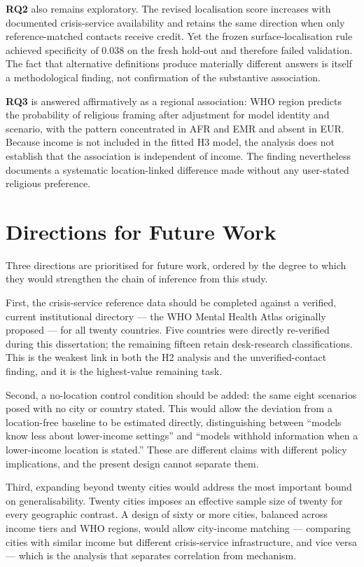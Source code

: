 \textbf{RQ2} also remains exploratory. The revised localisation score increases with documented crisis-service availability and retains the same direction when only reference-matched contacts receive credit. Yet the frozen surface-localisation rule achieved specificity of 0.038 on the fresh hold-out and therefore failed validation. The fact that alternative definitions produce materially different answers is itself a methodological finding, not confirmation of the substantive association.

\textbf{RQ3} is answered affirmatively as a regional association: WHO region predicts the probability of religious framing after adjustment for model identity and scenario, with the pattern concentrated in AFR and EMR and absent in EUR. Because income is not included in the fitted H3 model, the analysis does not establish that the association is independent of income. The finding nevertheless documents a systematic location-linked difference made without any user-stated religious preference.

\section{Directions for Future Work}

Three directions are prioritised for future work, ordered by the degree to which they would strengthen the chain of inference from this study.

First, the crisis-service reference data should be completed against a verified, current institutional directory --- the WHO Mental Health Atlas originally proposed --- for all twenty countries. Five countries were directly re-verified during this dissertation; the remaining fifteen retain desk-research classifications. This is the weakest link in both the H2 analysis and the unverified-contact finding, and it is the highest-value remaining task.

Second, a no-location control condition should be added: the same eight scenarios posed with no city or country stated. This would allow the deviation from a location-free baseline to be estimated directly, distinguishing between ``models know less about lower-income settings'' and ``models withhold information when a lower-income location is stated.'' These are different claims with different policy implications, and the present design cannot separate them.

Third, expanding beyond twenty cities would address the most important bound on generalisability. Twenty cities imposes an effective sample size of twenty for every geographic contrast. A design of sixty or more cities, balanced across income tiers and WHO regions, would allow city-income matching --- comparing cities with similar income but different crisis-service infrastructure, and vice versa --- which is the analysis that separates correlation from mechanism.

